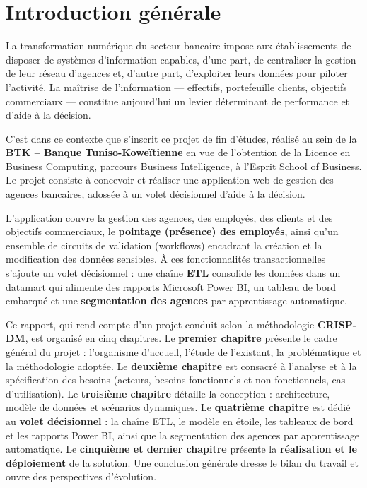 \chapter*{Introduction générale}

La transformation numérique du secteur bancaire impose aux établissements de
disposer de systèmes d'information capables, d'une part, de centraliser la
gestion de leur réseau d'agences et, d'autre part, d'exploiter leurs données
pour piloter l'activité. La maîtrise de l'information --- effectifs, portefeuille
clients, objectifs commerciaux --- constitue aujourd'hui un levier déterminant de
performance et d'aide à la décision.

C'est dans ce contexte que s'inscrit ce projet de fin d'études, réalisé au sein
de la \textbf{BTK -- Banque Tuniso-Koweïtienne} en vue de l'obtention de la
Licence en Business Computing, parcours Business Intelligence, à l'Esprit School
of Business. Le projet consiste à concevoir et réaliser une application web de
gestion des agences bancaires, adossée à un volet décisionnel d'aide à la
décision.

L'application couvre la gestion des agences, des employés, des clients et des
objectifs commerciaux, le \textbf{pointage (présence) des employés}, ainsi qu'un
ensemble de circuits de validation (workflows) encadrant la création et la
modification des données sensibles. À ces fonctionnalités transactionnelles
s'ajoute un volet décisionnel : une chaîne \textbf{ETL} consolide les données dans
un datamart qui alimente des rapports Microsoft Power BI, un tableau de bord
embarqué et une \textbf{segmentation des agences} par apprentissage automatique.

Ce rapport, qui rend compte d'un projet conduit selon la méthodologie
\textbf{CRISP-DM}, est organisé en cinq chapitres.
Le \textbf{premier chapitre} présente le cadre général du projet : l'organisme
d'accueil, l'étude de l'existant, la problématique et la méthodologie adoptée. Le
\textbf{deuxième chapitre} est consacré à l'analyse et à la spécification des
besoins (acteurs, besoins fonctionnels et non fonctionnels, cas d'utilisation).
Le \textbf{troisième chapitre} détaille la conception : architecture, modèle de
données et scénarios dynamiques. Le \textbf{quatrième chapitre} est dédié au
\textbf{volet décisionnel} : la chaîne ETL, le modèle en étoile, les tableaux de
bord et les rapports Power BI, ainsi que la segmentation des agences par
apprentissage automatique. Le \textbf{cinquième et dernier chapitre} présente la
\textbf{réalisation et le déploiement} de la solution. Une conclusion générale
dresse le bilan du travail et ouvre des perspectives d'évolution.
